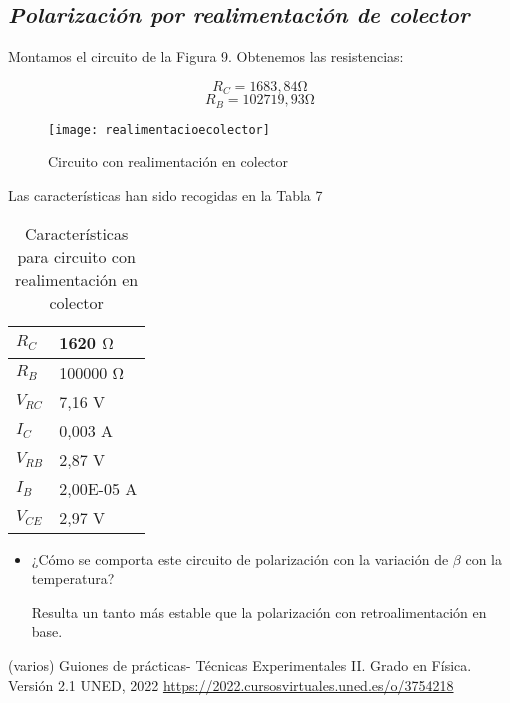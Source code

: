 \documentclass[a4paper,12pt,spanish]{article}
\begin{document}
\subsection*{\textit{Polarización por realimentación de colector}}

Montamos el circuito de la Figura 9. Obtenemos las resistencias:

\[R_C =  1683,84 \si{\ohm} \]
\[R_B =  102719,93\si{\ohm} \]


\begin{figure}[H]
	\centering
	\texttt{[image: realimentacioecolector]}
	\caption{Circuito con realimentación en colector}
	\label{fig:realimentacioecolector}
\end{figure}


Las características han sido recogidas en la Tabla 7

\begin{table}[H]
	\centering
	\begin{tabular}{|l|l|}
		\hline
		$R_C$  & 1620 $\si{\ohm}$   \\ \hline
		$R_B$    & 100000 $\si{\ohm}$   \\ \hline
		$V_{RC}$ & 7,16 V   \\ \hline
		$I_C$    & 0,003 A\\ \hline
		$V_{RB}$ & 2,87  V \\ \hline
		$I_B$     & 	2,00E-05 A   \\ \hline
		$V_{CE}$ & 2,97  V \\ \hline
	\end{tabular}
	\caption{Características para circuito con realimentación en colector}
	\label{tab:my-table}
\end{table}

\begin{itemize}
	\item¿Cómo se comporta este circuito de polarización con la variación de $\beta$ con la temperatura?
	
	Resulta un tanto más estable que la polarización con retroalimentación en base.
	
\end{itemize}


\begin{thebibliography}{1}
	
	
	 (varios) Guiones de prácticas- Técnicas Experimentales II. Grado en Física. Versión 2.1  UNED, 2022 \url{https://2022.cursosvirtuales.uned.es/o/3754218}
	
	
\end{thebibliography}
\end{document}
